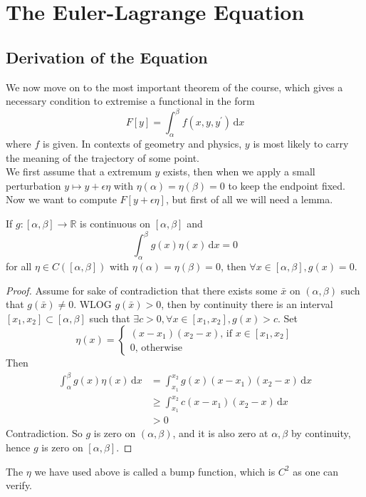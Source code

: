 \section{The Euler-Lagrange Equation}
\subsection{Derivation of the Equation}
We now move on to the most important theorem of the course, which gives a necessary condition to extremise a functional in the form
$$F[y]=\int_\alpha^\beta f(x,y,y^\prime)\,\mathrm dx$$
where $f$ is given.
In contexts of geometry and physics, $y$ is most likely to carry the meaning of the trajectory of some point.\\
We first assume that a extremum $y$ exists, then when we apply a small perturbation $y\mapsto y+\epsilon\eta$ with $\eta(\alpha)=\eta(\beta)=0$ to keep the endpoint fixed.
Now we want to compute $F[y+\epsilon\eta]$, but first of all we will need a lemma.
\begin{lemma}\label{fund_lemma}
    If $g:[\alpha,\beta]\to\mathbb R$ is continuous on $[\alpha,\beta]$ and
    $$\int_\alpha^\beta g(x)\eta(x)\,\mathrm dx=0$$
    for all $\eta\in C([\alpha,\beta])$ with $\eta(\alpha)=\eta(\beta)=0$, then $\forall x\in [\alpha,\beta],g(x)=0$.
\end{lemma}
\begin{proof}
    Assume for sake of contradiction that there exists some $\bar{x}$ on $(\alpha,\beta)$ such that $g(\bar{x})\neq 0$.
    WLOG $g(\bar{x})>0$, then by continuity there is an interval $[x_1,x_2]\subset[\alpha,\beta]$ such that $\exists c>0,\forall x\in [x_1,x_2],g(x)>c$.
    Set
    $$\eta(x)=\begin{cases}
        (x-x_1)(x_2-x)\text{, if $x\in [x_1,x_2]$}\\
        0\text{, otherwise}
    \end{cases}$$
    Then
    \begin{align*}
        \int_\alpha^\beta g(x)\eta(x)\,\mathrm dx
        &=\int_{x_1}^{x_2}g(x)(x-x_1)(x_2-x)\,\mathrm dx\\
        &\ge\int_{x_1}^{x_2}c(x-x_1)(x_2-x)\,\mathrm dx\\
        &>0
    \end{align*}
    Contradiction.
    So $g$ is zero on $(\alpha,\beta)$, and it is also zero at $\alpha,\beta$ by continuity, hence $g$ is zero on $[\alpha,\beta]$.
\end{proof}
The $\eta$ we have used above is called a bump function, which is $C^2$ as one can verify.
